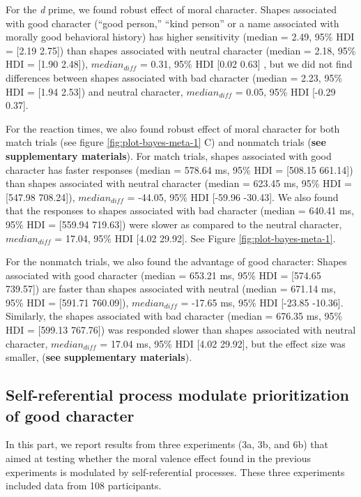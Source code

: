 \documentclass[
  english,
  man]{apa6}
\begin{document}
For the \emph{d} prime, we found robust effect of moral character. Shapes associated with good character (``good person,'' ``kind person'' or a name associated with morally good behavioral history) has higher sensitivity (median = 2.49, 95\% HDI = {[}2.19 2.75{]}) than shapes associated with neutral character (median = 2.18, 95\% HDI = {[}1.90 2.48{]}), \(median_{diff}\) = 0.31, 95\% HDI {[}0.02 0.63{]} , but we did not find differences between shapes associated with bad character (median = 2.23, 95\% HDI = {[}1.94 2.53{]}) and neutral character, \(median_{diff}\) = 0.05, 95\% HDI {[}-0.29 0.37{]}.

For the reaction times, we also found robust effect of moral character for both match trials (see figure \ref{fig:plot-bayes-meta-1} C) and nonmatch trials (\textbf{see supplementary materials}). For match trials, shapes associated with good character has faster responses (median = 578.64 ms, 95\% HDI = {[}508.15 661.14{]}) than shapes associated with neutral character (median = 623.45 ms, 95\% HDI = {[}547.98 708.24{]}), \(median_{diff}\) = -44.05, 95\% HDI {[}-59.96 -30.43{]}. We also found that the responses to shapes associated with bad character (median = 640.41 ms, 95\% HDI = {[}559.94 719.63{]}) were slower as compared to the neutral character, \(median_{diff}\) = 17.04, 95\% HDI {[}4.02 29.92{]}. See Figure \ref{fig:plot-bayes-meta-1}.

For the nonmatch trials, we also found the advantage of good character: Shapes associated with good character (median = 653.21 ms, 95\% HDI = {[}574.65 739.57{]}) are faster than shapes associated with neutral (median = 671.14 ms, 95\% HDI = {[}591.71 760.09{]}), \(median_{diff}\) = -17.65 ms, 95\% HDI {[}-23.85 -10.36{]}. Similarly, the shapes associated with bad character (median = 676.35 ms, 95\% HDI = {[}599.13 767.76{]}) was responded slower than shapes associated with neutral character, \(median_{diff}\) = 17.04 ms, 95\% HDI {[}4.02 29.92{]}, but the effect size was smaller, (\textbf{see supplementary materials}).

\hypertarget{self-referential-process-modulate-prioritization-of-good-character}{%
\subsection{Self-referential process modulate prioritization of good character}\label{self-referential-process-modulate-prioritization-of-good-character}}

In this part, we report results from three experiments (3a, 3b, and 6b) that aimed at testing whether the moral valence effect found in the previous experiments is modulated by self-referential processes. These three experiments included data from 108 participants.
\end{document}
